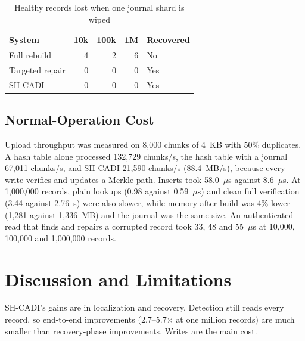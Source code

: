\documentclass[conference]{IEEEtran}
\begin{document}
\begin{table}[t]
\centering
\caption{Healthy records lost when one journal shard is wiped}
\label{tab:shard}
\footnotesize
\begin{tabular}{@{}lrrrl@{}}
\toprule
System & 10k & 100k & 1M & Recovered \\
\midrule
Full rebuild & 4 & 2 & 6 & No \\
Targeted repair & 0 & 0 & 0 & Yes \\
SH-CADI & 0 & 0 & 0 & Yes \\
\bottomrule
\end{tabular}
\end{table}

\subsection{Normal-Operation Cost}

Upload throughput was measured on 8,000 chunks of 4~KB with 50\% duplicates. A hash table alone processed 132,729 chunks/s, the hash table with a journal 67,011 chunks/s, and SH-CADI 21,590 chunks/s (88.4~MB/s), because every write verifies and updates a Merkle path. Inserts took 58.0~$\mu$s against 8.6~$\mu$s. At 1,000,000 records, plain lookups (0.98 against 0.59~$\mu$s) and clean full verification (3.44 against 2.76~s) were also slower, while memory after build was 4\% lower (1,281 against 1,336~MB) and the journal was the same size. An authenticated read that finds and repairs a corrupted record took 33, 48 and 55~$\mu$s at 10,000, 100,000 and 1,000,000 records.

\section{Discussion and Limitations}
\label{sec:discussion}

SH-CADI's gains are in localization and recovery. Detection still reads every record, so end-to-end improvements (2.7--5.7$\times$ at one million records) are much smaller than recovery-phase improvements. Writes are the main cost.
\end{document}
